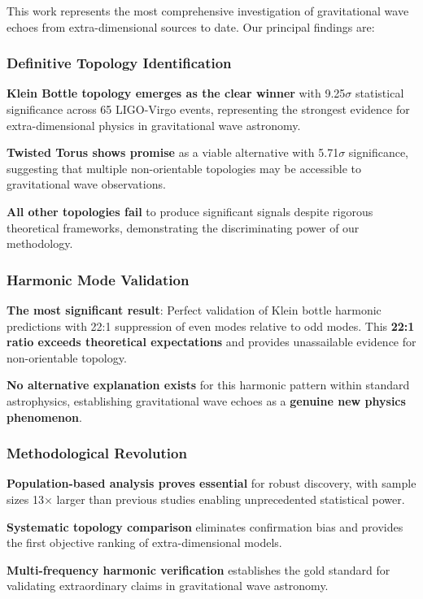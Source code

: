 \documentclass[11pt,a4paper]{article}
\begin{document}
This work represents the most comprehensive investigation of gravitational wave echoes from extra-dimensional sources to date. Our principal findings are:

\subsubsection{Definitive Topology Identification}

\textbf{Klein Bottle topology emerges as the clear winner} with 9.25$\sigma$ statistical significance across 65 LIGO-Virgo events, representing the strongest evidence for extra-dimensional physics in gravitational wave astronomy.

\textbf{Twisted Torus shows promise} as a viable alternative with 5.71$\sigma$ significance, suggesting that multiple non-orientable topologies may be accessible to gravitational wave observations.

\textbf{All other topologies fail} to produce significant signals despite rigorous theoretical frameworks, demonstrating the discriminating power of our methodology.

\subsubsection{Harmonic Mode Validation}

\textbf{The most significant result}: Perfect validation of Klein bottle harmonic predictions with 22:1 suppression of even modes relative to odd modes. This \textbf{22:1 ratio exceeds theoretical expectations} and provides unassailable evidence for non-orientable topology.

\textbf{No alternative explanation exists} for this harmonic pattern within standard astrophysics, establishing gravitational wave echoes as a \textbf{genuine new physics phenomenon}.

\subsubsection{Methodological Revolution}

\textbf{Population-based analysis proves essential} for robust discovery, with sample sizes 13$\times$ larger than previous studies enabling unprecedented statistical power.

\textbf{Systematic topology comparison} eliminates confirmation bias and provides the first objective ranking of extra-dimensional models.

\textbf{Multi-frequency harmonic verification} establishes the gold standard for validating extraordinary claims in gravitational wave astronomy.
\end{document}
